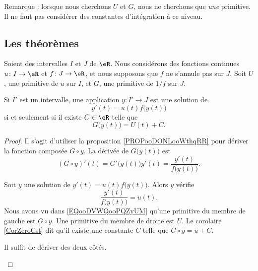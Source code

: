 Remarque : lorsque nous cherchons \( U\) et \( G\), nous ne cherchons que \emph{une} primitive. Il ne faut pas considérer des constantes d'intégration à ce niveau.

\subsection{Les théorèmes}

\begin{proposition}     \label{ProJLykrK}
	Soient des intervalles \( I\) et \( J\) de \( \eR\). Nous considérons des fonctions continues \( u\colon I\to \eR\) et \( f\colon J\to \eR\), et nous supposons que \( f\) ne s'annule pas sur \( J\). Soit \( U\), une primitive de \( u\) sur \( I\), et \( G\), une primitive de \( 1/f\) sur \( J\).

	Si \( I'\) est un intervalle, une application \( y\colon I'\to J\) est une solution de
	\begin{equation}		\label{EQooJVCQooGoVPVA}
		y'(t)=u(t)f\big( y(t) \big)
	\end{equation}
	si et seulement si il existe \( C\in \eR\) telle que
	\begin{equation}		\label{EqSoluceEqDiffSep}
		G\big( y(t) \big)=U(t)+C.
	\end{equation}
\end{proposition}


\begin{proof}
	Il s'agit d'utiliser la proposition \ref{PROPooDONLooWthqRR} pour dériver la fonction composée \( G\circ y\). La dérivée de \( G\big( y(t) \big)\) est
	\begin{equation}		\label{EQooDVWQooPQZyUM}
		(G\circ y)'(t)=G'\big( y(t) \big)y'(t)=\frac{ y'(t) }{ f\big( y(t) \big) }.
	\end{equation}

	\begin{subproof}
		\spitem[\( \Rightarrow\)]
		Soit \( y\) une solution de \( y'(t)=u(t)f\big( y(t) \big)\). Alors \( y\) vérifie
		\begin{equation}
			\frac{ y'(t) }{ f\big( y(t) \big) }=u(t).
		\end{equation}
		Nous avons vu dans \eqref{EQooDVWQooPQZyUM} qu'une primitive du membre de gauche est \( G\circ y\). Une primitive du membre de droite est \( U\). Le corolaire \ref{CorZeroCst} dit qu'il existe une constante \( C\) telle que \( G\circ y=u+C\).

		\spitem[\( \Leftarrow\)]
		Il suffit de dériver des deux côtés.
	\end{subproof}
\end{proof}


